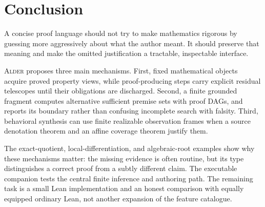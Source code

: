 \documentclass[11pt,a4paper]{article}
\newcommand{\Alder}{\textsc{Alder}}
\theoremstyle{plain}
\theoremstyle{definition}
\theoremstyle{remark}
\begin{document}
\section{Conclusion}
A concise proof language should not try to make mathematics rigorous by guessing more aggressively about what the author meant. It should preserve that meaning and make the omitted justification a tractable, inspectable interface.

\Alder{} proposes three main mechanisms. First, fixed mathematical objects acquire proved property views, while proof-producing steps carry explicit residual telescopes until their obligations are discharged. Second, a finite grounded fragment computes alternative sufficient premise sets with proof DAGs, and reports its boundary rather than confusing incomplete search with falsity. Third, behavioral synthesis can use finite realizable observation frames when a source denotation theorem and an affine coverage theorem justify them.

The exact-quotient, local-differentiation, and algebraic-root examples show why these mechanisms matter: the missing evidence is often routine, but its type distinguishes a correct proof from a subtly different claim. The executable companion tests the central finite inference and authoring path. The remaining task is a small Lean implementation and an honest comparison with equally equipped ordinary Lean, not another expansion of the feature catalogue.

\clearpage\appendix
\end{document}
